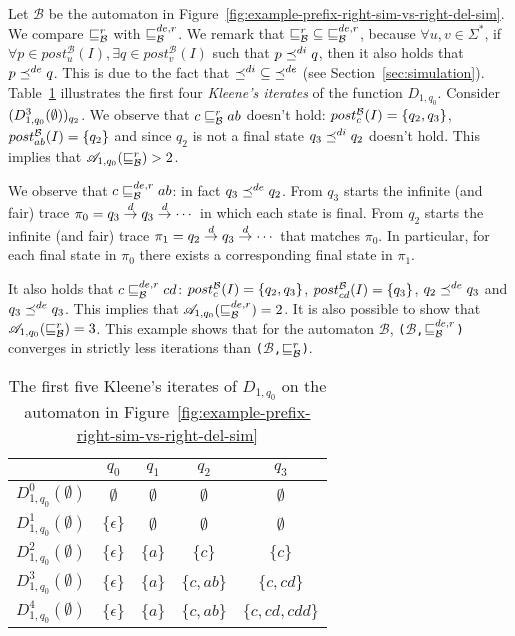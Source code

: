 \begin{example}
Let $\mathcal{B}$ be the automaton in
Figure~\ref{fig:example-prefix-right-sim-vs-right-del-sim}.
We compare $\sqsubseteq_{\mathcal{B}}^r$ with $\sqsubseteq_{\mathcal{B}}^{de,r}$.
We remark that $\mathord{\sqsubseteq_{\mathcal{B}}^r} \subseteq \mathord{\sqsubseteq_{\mathcal{B}}^{de,r}}$,
because $\forall u,v \in \Sigma^*$,
if $\forall p \in post_u^{\mathcal{B}}(I), \exists q \in post_v^{\mathcal{B}}(I)$
such that $p \preceq^{di} q$, then it also holds that $p \preceq^{de} q$.
This is due to the fact that $\mathord{\preceq^{di}} \subseteq \mathord{\preceq^{de}}$
(see Section~\ref{sec:simulation}).
Table~\ref{table:D_1-example2} illustrates the first four \emph{Kleene's iterates}
of the function $D_{1,q_0}$.
Consider $(D_{1,q_0}^{3}(\emptyset))_{q_2}$.
We observe that $c \sqsubseteq_{\mathcal{B}}^r ab$ doesn't hold:
$post_{c}^{\mathcal{B}}(I) = \{q_2, q_3\}$, $post_{ab}^{\mathcal{B}}(I) = \{q_2\}$ and since $q_2$ is
not a final state $q_3 \preceq^{di} q_2$ doesn't hold.
This implies that $\mathscr{A}_{1, q_0}(\sqsubseteq_{\mathcal{B}}^r) > 2$.

We observe that $c \sqsubseteq_{\mathcal{B}}^{de,r} ab$: in fact $q_3 \preceq^{de} q_2$.
From $q_3$ starts the infinite (and fair)
trace $\pi_0 = q_3 \overset{d}{\rightarrow} q_3 \overset{d}{\rightarrow} \cdots$ in which each state is final.
From $q_2$ starts the infinite (and fair) trace
$\pi_1 = q_2 \overset{d}{\rightarrow} q_3 \overset{d}{\rightarrow} \cdots$ that matches $\pi_0$.
In particular, for each final state in $\pi_0$ there exists a corresponding
final state in $\pi_1$.

It also holds that $c \sqsubseteq_{\mathcal{B}}^{de,r} cd$: $post_{c}^{\mathcal{B}}(I) = \{q_2,q_3\}$,
$post_{cd}^{\mathcal{B}}(I) = \{q_3\}$, $q_2 \preceq^{de} q_3$ and $q_3 \preceq^{de} q_3$.
This implies that $\mathscr{A}_{1, q_0}(\sqsubseteq_{\mathcal{B}}^{de,r}) = 2$.
It is also possible to show that $\mathscr{A}_{1, q_0}(\sqsubseteq_{\mathcal{B}}^r) = 3$.
This example shows that for the automaton $\mathcal{B}$,
\texttt{($\mathcal{B}$,$\sqsubseteq_{\mathcal{B}}^{de,r}$)} converges in strictly less iterations
than \texttt{($\mathcal{B}$,$\sqsubseteq_{\mathcal{B}}^r$)}.
\end{example}

\begin{table}[h]
\centering
\begin{tabular}{ c | c | c | c | c }
 & $q_0$ & $q_1$ & $q_2$ & $q_3$ \\
\hline
$D_{1,q_0}^0(\emptyset)$ & $\emptyset$ & $\emptyset$ & $\emptyset$ & $\emptyset$ \\
$D_{1,q_0}^1(\emptyset)$ & $\{\epsilon\}$ & $\emptyset$ & $\emptyset$ & $\emptyset$ \\
$D_{1,q_0}^2(\emptyset)$ & $\{\epsilon\}$ & $\{a\}$ & $\{c\}$ & $\{c\}$ \\
$D_{1,q_0}^3(\emptyset)$ & $\{\epsilon\}$ & $\{a\}$ & $\{c, ab\}$ & $\{c, cd\}$ \\
$D_{1,q_0}^4(\emptyset)$ & $\{\epsilon\}$ & $\{a\}$ & $\{c, ab\}$ & $\{c, cd, cdd\}$ \\
\end{tabular}
\caption{The first five Kleene's iterates of $D_{1,q_0}$ on the automaton in
Figure~\ref{fig:example-prefix-right-sim-vs-right-del-sim}}
\label{table:D_1-example2}
\end{table}


